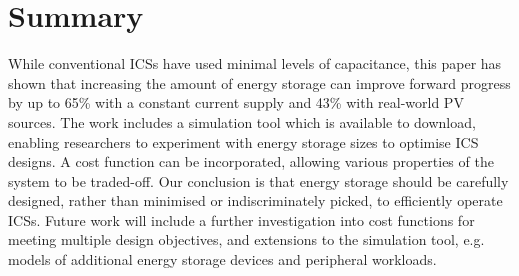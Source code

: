 \section{Summary} \label{sec:c3_summary}

While conventional ICSs have used minimal levels of capacitance, this paper has shown that increasing the amount of energy storage can improve forward progress by up to 65\% with a constant current supply and 43\% with real-world PV sources. The work includes a simulation tool which is available to download, enabling researchers to experiment with energy storage sizes to optimise ICS designs. A cost function can be incorporated, allowing various properties of the system to be traded-off. Our conclusion is that energy storage should be carefully designed, rather than minimised or indiscriminately picked, to efficiently operate ICSs. Future work will include a further investigation into cost functions for meeting multiple design objectives, and extensions to the simulation tool, e.g. models of additional energy storage devices and peripheral workloads.